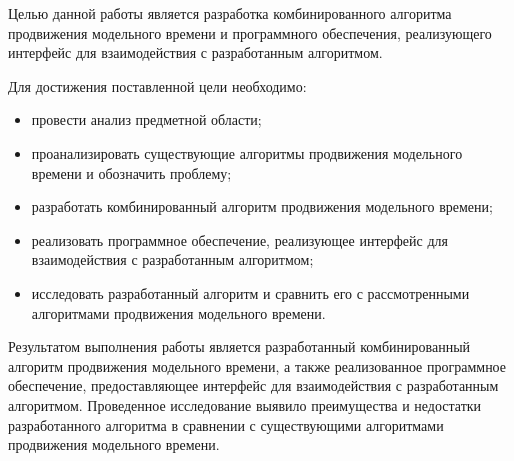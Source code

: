 \begin{essay}{}
Целью данной работы является разработка комбинированного алгоритма продвижения модельного времени и программного обеспечения, реализующего интерфейс для взаимодействия с разработанным алгоритмом.\newline

Для достижения поставленной цели необходимо:
\begin{itemize}
	\item провести анализ предметной области;
	\item проанализировать существующие алгоритмы продвижения модельного времени и обозначить проблему;
	\item разработать комбинированный алгоритм продвижения модельного времени;
	\item реализовать программное обеспечение, реализующее интерфейс для взаимодействия с разработанным алгоритмом;
	\item исследовать разработанный алгоритм и сравнить его с рассмотренными алгоритмами продвижения модельного времени.
\end{itemize}

Результатом выполнения работы является разработанный комбинированный алгоритм продвижения модельного времени, а также реализованное программное обеспечение, предоставляющее интерфейс для взаимодействия с разработанным алгоритмом. Проведенное исследование выявило преимущества и недостатки разработанного алгоритма в сравнении с существующими алгоритмами продвижения модельного времени.
\end{essay}
